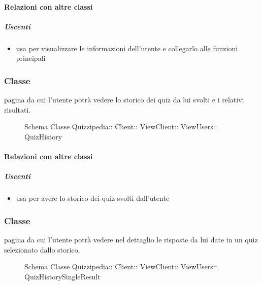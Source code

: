 \paragraph{Relazioni con altre classi}
\subparagraph{Uscenti}
\begin{itemize}
\item usa  per visualizzare le informazioni dell'utente e collegarlo alle funzioni principali
\end{itemize}
\subsubsection{Classe }
pagina da cui l'utente potrà vedere lo storico dei quiz da lui svolti e i relativi risultati.
\begin{figure}[H]
\centering
\noindent{}
\caption[Schema Classe QuizHistory]{Schema Classe Quizzipedia:: Client:: ViewClient:: ViewUsers:: QuizHistory}
\end{figure}
\paragraph{Relazioni con altre classi}
\subparagraph{Uscenti}
\begin{itemize}
\item usa  per avere lo storico dei quiz svolti dall'utente
\end{itemize}
\subsubsection{Classe }
pagina da cui l'utente potrà vedere nel dettaglio le risposte da lui date in un quiz selezionato dallo storico.
\begin{figure}[H]
\centering
\noindent{}
\caption[Schema Classe QuizHistorySingleResult]{Schema Classe Quizzipedia:: Client:: ViewClient:: ViewUsers:: QuizHistorySingleResult}
\end{figure}
